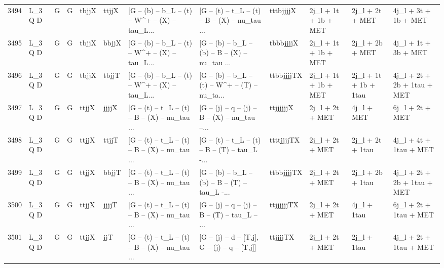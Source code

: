 \begin{tabular}{llllllllllll}
3494 &      L\_3 Q D &     G &     G &       tbjjX &       ttjjX &  [G -- (b) -- b\_L -- (t) -- W\textasciicircum + -- (X) -- tau\_L... &  [G -- (t) -- t\_L -- (t) -- B -- (X) -- nu\_tau ... &   tttbjjjjX &     2j\_l + 1t + 1b + MET &          2j\_l + 2t + MET &               4j\_l + 3t + 1b + MET \\
3495 &      L\_3 Q D &     G &     G &       tbjjX &       bbjjX &  [G -- (b) -- b\_L -- (t) -- W\textasciicircum + -- (X) -- tau\_L... &  [G -- (b) -- b\_L -- (b) -- B -- (X) -- nu\_tau ... &   tbbbjjjjX &     2j\_l + 1t + 1b + MET &          2j\_l + 2b + MET &               4j\_l + 1t + 3b + MET \\
3496 &      L\_3 Q D &     G &     G &       tbjjX &       tbjjT &  [G -- (b) -- b\_L -- (t) -- W\textasciicircum + -- (X) -- tau\_L... &  [G -- (b) -- b\_L -- (t) -- W\textasciicircum + -- (T) -- nu\_ta... &  ttbbjjjjTX &     2j\_l + 1t + 1b + MET &    2j\_l + 1t + 1b + 1tau &        4j\_l + 2t + 2b + 1tau + MET \\
3497 &      L\_3 Q D &     G &     G &       ttjjX &       jjjjX &  [G -- (t) -- t\_L -- (t) -- B -- (X) -- nu\_tau ... &  [G -- (j) -- q -- (j) -- B -- (X) -- nu\_tau --... &   ttjjjjjjX &          2j\_l + 2t + MET &               4j\_l + MET &                    6j\_l + 2t + MET \\
3498 &      L\_3 Q D &     G &     G &       ttjjX &       ttjjT &  [G -- (t) -- t\_L -- (t) -- B -- (X) -- nu\_tau ... &  [G -- (t) -- t\_L -- (t) -- B -- (T) -- tau\_L -... &  ttttjjjjTX &          2j\_l + 2t + MET &         2j\_l + 2t + 1tau &             4j\_l + 4t + 1tau + MET \\
3499 &      L\_3 Q D &     G &     G &       ttjjX &       bbjjT &  [G -- (t) -- t\_L -- (t) -- B -- (X) -- nu\_tau ... &  [G -- (b) -- b\_L -- (b) -- B -- (T) -- tau\_L -... &  ttbbjjjjTX &          2j\_l + 2t + MET &         2j\_l + 2b + 1tau &        4j\_l + 2t + 2b + 1tau + MET \\
3500 &      L\_3 Q D &     G &     G &       ttjjX &       jjjjT &  [G -- (t) -- t\_L -- (t) -- B -- (X) -- nu\_tau ... &  [G -- (j) -- q -- (j) -- B -- (T) -- tau\_L -- ... &  ttjjjjjjTX &          2j\_l + 2t + MET &              4j\_l + 1tau &             6j\_l + 2t + 1tau + MET \\
3501 &      L\_3 Q D &     G &     G &       ttjjX &         jjT &  [G -- (t) -- t\_L -- (t) -- B -- (X) -- nu\_tau ... &   [G -- (j) -- d -- [T,j], G -- (j) -- q -- [T,j]] &    ttjjjjTX &          2j\_l + 2t + MET &              2j\_l + 1tau &             4j\_l + 2t + 1tau + MET \\

\end{tabular}
